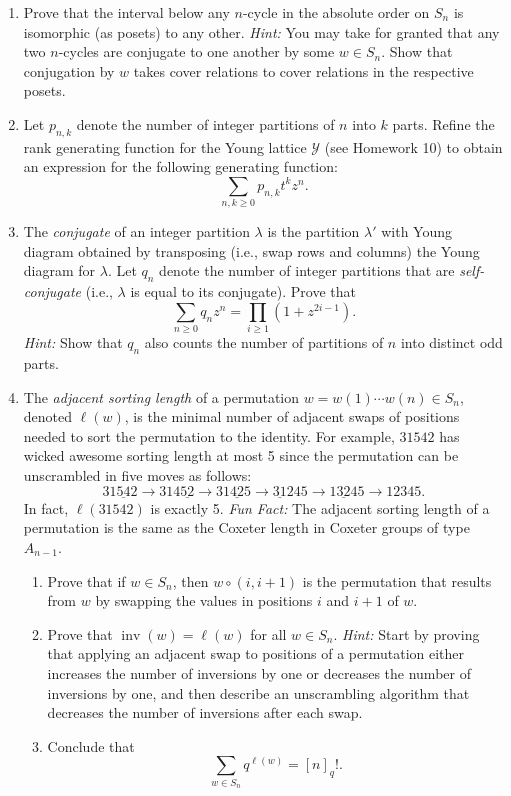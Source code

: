 \documentclass[11pt]{article}%
\theoremstyle{definition}
\DeclareMathOperator{\inv}{inv}
\begin{document}
\begin{enumerate}

\item Prove that the interval below any $n$-cycle in the absolute order on $S_n$ is isomorphic (as posets) to any other.  \emph{Hint:} You may take for granted that any two $n$-cycles are conjugate to one another by some $w\in S_n$. Show that conjugation by $w$ takes cover relations to cover relations in the respective posets.

\item Let $p_{n,k}$ denote the number of integer partitions of $n$ into $k$ parts. Refine the rank generating function for the Young lattice $\mathcal{Y}$ (see Homework 10) to obtain an expression for the following generating function:
\[
\sum_{n,k\geq 0}p_{n,k}t^kz^n.
\]

\item The \emph{conjugate} of an integer partition $\lambda$ is the partition $\lambda'$ with Young diagram obtained by transposing (i.e., swap rows and columns) the Young diagram for $\lambda$.  Let $q_n$ denote the number of integer partitions that are \emph{self-conjugate} (i.e., $\lambda$ is equal to its conjugate). Prove that
\[
\sum_{n\geq 0}q_nz^n =\prod_{i\geq 1}(1+z^{2i-1}).
\]
\emph{Hint:} Show that $q_n$ also counts the number of partitions of $n$ into distinct odd parts.

\item The \emph{adjacent sorting length} of a permutation $w=w(1)\cdots w(n)\in S_n$, denoted $\ell(w)$, is the minimal number of adjacent swaps of positions needed to sort the permutation to the identity. For example, $31542$ has wicked awesome sorting length at most 5 since the permutation can be unscrambled in five moves as follows:
\[
31\underline{54}2 \to 314\underline{52} \to 31\underline{42}5 \to \underline{31}245 \to 1\underline{32}45 \to 12345.
\]
In fact, $\ell(31542)$ is exactly 5. \emph{Fun Fact:} The adjacent sorting length of a permutation is the same as the Coxeter length in Coxeter groups of type $A_{n-1}$.
\begin{enumerate}
\item Prove that if $w\in S_n$, then $w\circ (i,i+1)$ is the permutation that results from $w$ by swapping the values in positions $i$ and $i+1$ of $w$.
\item Prove that $\inv(w)=\ell(w)$ for all $w\in S_n$. \emph{Hint:} Start by proving that applying an adjacent swap to positions of a permutation either increases the number of inversions by one or decreases the number of inversions by one, and then describe an unscrambling algorithm that decreases the number of inversions after each swap.
\item Conclude that 
\[
\sum_{w\in S_n}q^{\ell(w)}=[n]_q!.
\]
\end{enumerate}


\end{enumerate}
\end{document}
